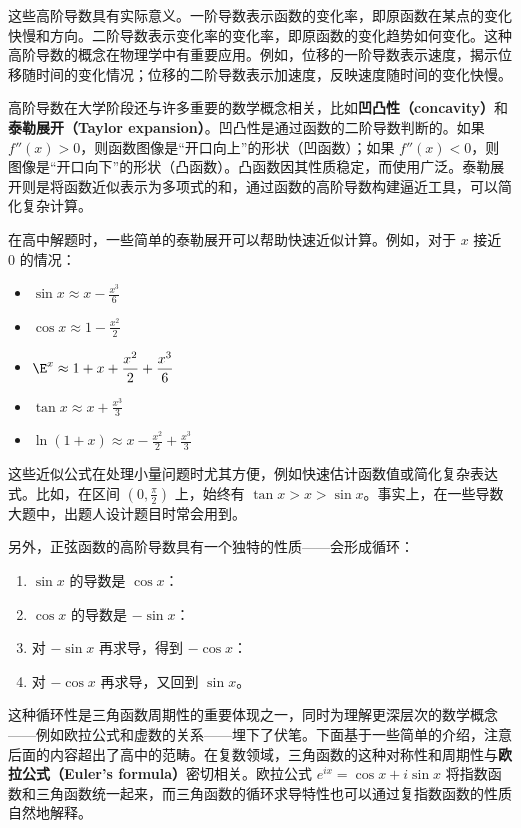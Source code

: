 这些高阶导数具有实际意义。一阶导数表示函数的变化率，即原函数在某点的变化快慢和方向。二阶导数表示变化率的变化率，即原函数的变化趋势如何变化。这种高阶导数的概念在物理学中有重要应用。例如，位移的一阶导数表示速度，揭示位移随时间的变化情况；位移的二阶导数表示加速度，反映速度随时间的变化快慢。

高阶导数在大学阶段还与许多重要的数学概念相关，比如\textbf{凹凸性（concavity）}和\textbf{泰勒展开（Taylor expansion）}。凹凸性是通过函数的二阶导数判断的。如果 $f''(x) > 0$，则函数图像是“开口向上”的形状（凹函数）；如果 $f''(x) < 0$，则图像是“开口向下”的形状（凸函数）。凸函数因其性质稳定，而使用广泛。泰勒展开则是将函数近似表示为多项式的和，通过函数的高阶导数构建逼近工具，可以简化复杂计算。

在高中解题时，一些简单的泰勒展开可以帮助快速近似计算。例如，对于 $x$ 接近 $0$ 的情况：
\begin{itemize}
\item $\displaystyle\sin x \approx x - \frac{x^3}{6}$
\item $\displaystyle\cos x \approx 1 - \frac{x^2}{2}$
\item $\displaystyle \E^x \approx 1 + x + \frac{x^2}{2} + \frac{x^3}{6}$
\item $\displaystyle\tan x \approx x + \frac{x^3}{3}$
\item $\displaystyle\ln (1 + x) \approx x - \frac{x^2}{2} + \frac{x^3}{3}$
\end{itemize}

这些近似公式在处理小量问题时尤其方便，例如快速估计函数值或简化复杂表达式。比如，在区间 $(0, \frac{\pi}{2})$ 上，始终有 $\tan x > x > \sin x$。事实上，在一些导数大题中，出题人设计题目时常会用到。

另外，正弦函数的高阶导数具有一个独特的性质——会形成循环：

\begin{enumerate}
\item $\sin x$ 的导数是 $\cos x$：
\item $\cos x$ 的导数是 $-\sin x$：
\item 对 $-\sin x$ 再求导，得到 $-\cos x$：
\item 对 $-\cos x$ 再求导，又回到 $\sin x$。
\end{enumerate}

这种循环性是三角函数周期性的重要体现之一，同时为理解更深层次的数学概念——例如欧拉公式和虚数的关系——埋下了伏笔。下面基于一些简单的介绍，注意后面的内容超出了高中的范畴。在复数领域，三角函数的这种对称性和周期性与\textbf{欧拉公式（Euler’s formula）}密切相关。欧拉公式 $e^{ix} = \cos x + i\sin x$ 将指数函数和三角函数统一起来，而三角函数的循环求导特性也可以通过复指数函数的性质自然地解释。

